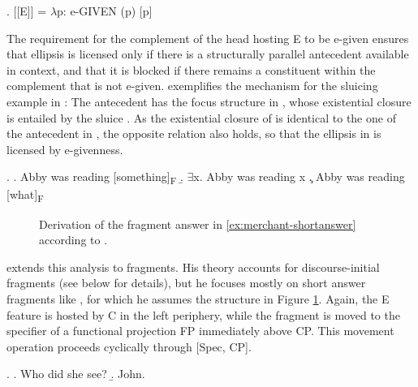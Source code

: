 \ex. [[E]] = $\lambda$p: e-GIVEN (p) [p] \hfill \citep[672]{merchant2004}

The requirement for the complement of the head hosting E to be e-given ensures that ellipsis is licensed only if there is a structurally parallel antecedent available in context, and that it is blocked if there remains a constituent within the complement that is not e-given. \Next exemplifies the mechanism for the sluicing example in \LLast: The antecedent has the focus structure in \Next[a], whose existential closure \Next[b] is entailed by the sluice \Next[c]. As the existential closure of \Next[c] is identical to the one of the antecedent in \Next[b], the opposite relation also holds, so that the ellipsis in \LLast is licensed by e-givenness.

\ex. \a. Abby was reading [something]\textsubscript{F}
     \b. $\exists$x. Abby was reading x
     \c. Abby was reading [what]\textsubscript{F}
     
\begin{figure}

\caption{Derivation of the fragment answer in \ref{ex:merchant-shortanswer} according to \citet{merchant2004}.\label{ex:merchant.structure-full}}
\end{figure}
%
\citet{merchant2004} extends this analysis to fragments. His theory accounts for discourse-initial fragments (see below for details), but he focuses mostly on short answer fragments like \Next, for which he assumes the structure in Figure \ref{ex:merchant.structure-full}. Again, the E feature is hosted by C in the left periphery, while the fragment is moved to the specifier of a functional projection FP immediately above CP. This movement operation proceeds cyclically through [Spec, CP].

\ex. \a. Who did she see? \hfill \citep[673]{merchant2004}
\b. John.\label{ex:merchant-shortanswer}

